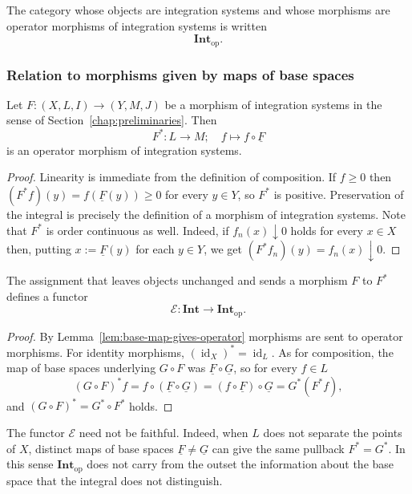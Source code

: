 \begin{definition}
  The category whose objects are integration systems and whose morphisms are
  operator morphisms of integration systems is written
  \[
    \mathbf{Int}_{\mathrm{op}} .
  \]
\end{definition}

\subsubsection{Relation to morphisms given by maps of base spaces}

\begin{lemma}\label{lem:base-map-gives-operator}
  Let $F:(X,L,I)\to(Y,M,J)$ be a morphism of integration systems in the sense of
  Section~\ref{chap:preliminaries}.
  Then
  \[
    F^*:L\to M;\quad f\mapsto f\circ\underline{F}
  \]
  is an operator morphism of integration systems.
\end{lemma}
\begin{proof}
  Linearity is immediate from the definition of composition.
  If $f\ge0$ then $(F^*f)(y)=f(\underline{F}(y))\ge0$ for every $y\in Y$, so
  $F^*$ is positive.
  Preservation of the integral is precisely the definition of a morphism of
  integration systems.
  Note that $F^*$ is order continuous as well. Indeed, if $f_n(x)\downarrow0$
  holds for every $x\in X$ then, putting $x:=\underline{F}(y)$ for each
  $y\in Y$, we get $(F^*f_n)(y)=f_n(x)\downarrow0$.
\end{proof}

\begin{proposition}\label{prop:base-to-operator-functor}
  The assignment that leaves objects unchanged and sends a morphism $F$ to
  $F^*$ defines a functor
  \[
    \mathcal{E}:\mathbf{Int}\to\mathbf{Int}_{\mathrm{op}} .
  \]
\end{proposition}
\begin{proof}
  By Lemma~\ref{lem:base-map-gives-operator} morphisms are sent to operator
  morphisms.
  For identity morphisms, $(\operatorname{id}_X)^*=\operatorname{id}_L$.
  As for composition, the map of base spaces underlying $G\circ F$ was
  $\underline{F}\circ\underline{G}$, so for every $f\in L$
  \[
    (G\circ F)^*f
    =f\circ(\underline{F}\circ\underline{G})
    =(f\circ\underline{F})\circ\underline{G}
    =G^*(F^*f) ,
  \]
  and $(G\circ F)^*=G^*\circ F^*$ holds.
\end{proof}

\begin{remark}
  The functor $\mathcal{E}$ need not be faithful.
  Indeed, when $L$ does not separate the points of $X$, distinct maps of base
  spaces $\underline{F}\ne\underline{G}$ can give the same pullback
  $F^*=G^*$.
  In this sense $\mathbf{Int}_{\mathrm{op}}$ does not carry from the outset the
  information about the base space that the integral does not distinguish.
\end{remark}

